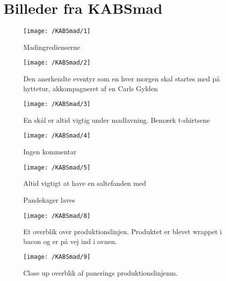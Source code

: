 \section{Billeder fra KABSmad} \label{app:kabsmad}

\begin{figure}[h!]
\centering
\texttt{[image: /KABSmad/1]}
\caption{Madingredienserne}
\end{figure}

\begin{figure}[h!]
\centering
\texttt{[image: /KABSmad/2]}
\caption{Den anerkendte eventyr som en hver morgen skal startes med på hyttetur, akkompagneret af en Carls Gylden }
\end{figure}

\begin{figure}[h!]
\centering
\texttt{[image: /KABSmad/3]}
\caption{En skål er altid vigtig under madlavning. Bemærk \HM t-shirtsene }
\end{figure}

\begin{figure}[h!]
\centering
\texttt{[image: /KABSmad/4]}
\caption{Ingen kommentar}
\end{figure}

\begin{figure}[h!]
\centering
\texttt{[image: /KABSmad/5]}
\caption{Altid vigtigt at have en saltefanden med}
\end{figure}

\begin{figure}[h!]
\centering
{}
\caption{Pandekager laves}
\label{fig:app1}
\end{figure}

\begin{figure}[h!]
\centering
\texttt{[image: /KABSmad/8]}
\caption{Et overblik over produktionslinjen. Produktet er blevet wrappet i bacon og er på vej ind i ovnen.}
\end{figure}

\begin{figure}[h!]
\centering
\texttt{[image: /KABSmad/9]}
\caption{Close up overblik af panerings produktionslinjenm.}
\end{figure}


